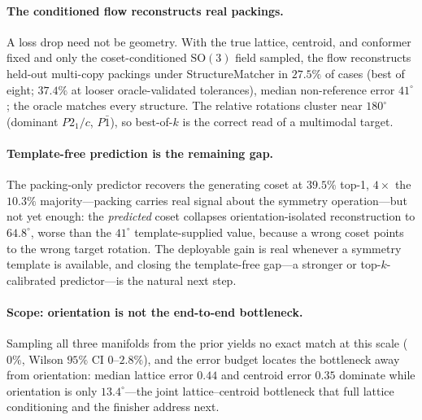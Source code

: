 \documentclass{article}
\begin{document}
\paragraph{The conditioned flow reconstructs real packings.}
A loss drop need not be geometry. With the true lattice, centroid, and conformer
fixed and only the coset-conditioned $\mathrm{SO}(3)$ field sampled, the flow
reconstructs held-out multi-copy packings under StructureMatcher in $27.5\%$ of
cases (best of eight; $37.4\%$ at looser oracle-validated tolerances), median
non-reference error $41^\circ$; the oracle matches every structure. The relative
rotations cluster near $180^\circ$ (dominant $P2_1/c$, $P\bar1$), so best-of-$k$ is
the correct read of a multimodal target.

\paragraph{Template-free prediction is the remaining gap.}
The packing-only predictor recovers the generating coset at $39.5\%$ top-1,
$4\times$ the $10.3\%$ majority---packing carries real signal about the symmetry
operation---but not yet enough: the \emph{predicted} coset collapses
orientation-isolated reconstruction to $64.8^\circ$, worse than the $41^\circ$
template-supplied value, because a wrong coset points to the wrong target rotation.
The deployable gain is real whenever a symmetry template is available, and closing
the template-free gap---a stronger or top-$k$-calibrated predictor---is the natural
next step.

\paragraph{Scope: orientation is not the end-to-end bottleneck.}
Sampling all three manifolds from the prior yields no exact match at this scale
($0\%$, Wilson $95\%$ CI $0$--$2.8\%$), and the error budget locates the bottleneck
away from orientation: median lattice error $0.44$ and centroid error $0.35$
dominate while orientation is only $13.4^\circ$---the joint lattice--centroid
bottleneck that full lattice conditioning and the finisher address next.
\end{document}
